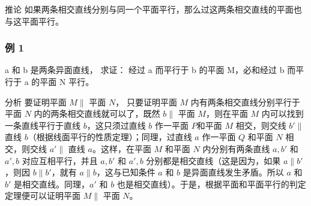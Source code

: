 推论
如果两条相交直线分别与同一个平面平行，那么过这两条相交直线的平面也与这平面平行。

\subsubsection{例 1}

a 和 b 是两条异面直线， 求证： 经过 a 而平行于 b 的平面 M，必和经过 b
而平行于 a 的平面 N 平行。

分析 要证明平面 \(M \parallel\) 平面 \(N\)， 只要证明平面 \(M\)
内有两条相交直线分别平行于平面 \(N\) 内的两条相交直线就可以了，既然
\(b \parallel\) 平面 \(M\)，则在平面 \(M\) 内可以找到一条直线平行于直线
\(b\)，这只须过直线 \(b\) 作一平面 \(P\)和平面 \(M\) 相交，则交线
\(b' \parallel\) 直线 \(b\)（根据线面平行的性质定理）；同理，过直线
\(a\) 作一平面 \(Q\) 和平面 \(N\) 相交，则交线 \(a' \parallel\) 直线
\(a\)。这样，在平面 \(M\) 和平面 \(N\) 内分别有两条直线 \(a, b'\) 和
\(a', b\) 对应互相平行，并且 \(a, b'\) 和 \(a', b\)
分别都是相交直线（这是因为，如果 \(a \parallel b'\)，则因
\(b \parallel b'\)，就有 \(a \parallel b\)，这与已知条件 \(a\) 和 \(b\)
是异面直线发生矛盾。所以 \(a\) 和 \(b'\) 是相交直线。同理，\(a'\) 和
\(b\) 也是相交直线）。于是，根据平面和平面平行的判定定理便可以证明平面
\(M \parallel\) 平面 \(N\)。


